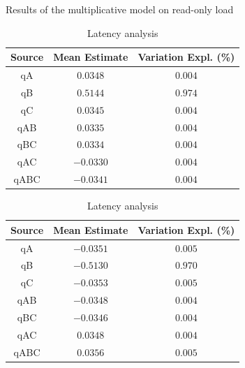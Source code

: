\documentclass[11pt,a4paper]{article}
\begin{document}
\begin{table}[h]
\centering
{Results of the multiplicative model on read-only load}
\begin{minipage}{.5\textwidth}
\centering
	\begin{tabular}{|c|c|c|}
	\hline 
	{\small Source} & {\small Mean Estimate} & {\small Variation Expl. (\%)} \\ 
	\hline 
	qA & $0.0348$ & $0.004$ \\ 
	\hline 
	qB & $0.5144$ & $0.974$ \\ 
	\hline 
	qC & $0.0345$ & $0.004$ \\ 
	\hline 
	qAB & $0.0335$ & $0.004$ \\ 
	\hline 
	qBC & $0.0334$ & $0.004$ \\ 
	\hline 
	qAC & $-0.0330$ & $0.004$ \\ 
	\hline 
	qABC & $-0.0341$ & $0.004$ \\ 
	\hline 
	\end{tabular} \caption{Throughput analysis} \label{tab:2k-mult-ro-tpt}
\end{minipage}%
\begin{minipage}{.5\textwidth}
\centering
	\begin{tabular}{|c|c|c|}
	\hline 
	{\small Source} & {\small Mean Estimate} & {\small Variation Expl. (\%)} \\ 
	\hline 
	qA & $-0.0351$ & $0.005$ \\ 
	\hline 
	qB & $-0.5130$ & $0.970$ \\ 
	\hline 
	qC & $-0.0353$ & $0.005$ \\ 
	\hline 
	qAB & $-0.0348$ & $0.004$ \\ 
	\hline 
	qBC & $-0.0346$ & $0.004$ \\ 
	\hline 
	qAC & $0.0348$ & $0.004$ \\ 
	\hline 
	qABC & $0.0356$ & $0.005$ \\ 
	\hline 
	\end{tabular} \caption{Latency analysis} \label{tab:2k-mult-ro-lat}
\end{minipage}
\end{table}\label{tab:2k-mult-ro}
\end{document}
